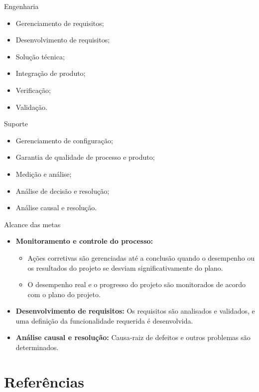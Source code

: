 \begin{frame}{Engenharia}
  \begin{itemize}[<+->]
  \item Gerenciamento de requisitos;
  \item Desenvolvimento de requisitos;
  \item Solução técnica;
  \item Integração de produto;
  \item Verificação;
  \item Validação.
  \end{itemize}
\end{frame}

\begin{frame}{Suporte}
  \begin{itemize}
  \item Gerenciamento de configuração;
  \item Garantia de qualidade de processo e produto;
  \item Medição e análise;
  \item Análise de decisão e resolução;
  \item Análise causal e resolução.
  \end{itemize}
\end{frame}

\begin{frame}{Alcance das metas}
  \begin{itemize}
  \item {\bf Monitoramento e controle do processo:} 
    \begin{itemize}
    \item Ações corretivas são gerenciadas até a conclusão quando o
      desempenho ou os resultados do projeto se desviam
      significativamente do plano.
    \item O desempenho real e o progresso do projeto são monitorados
      de acordo com o plano do projeto.
    \end{itemize}
  \item {\bf Desenvolvimento de requisitos:} Os requisitos são
    analisados e validados, e uma definição da funcionalidade
    requerida é desenvolvida.
  \item {\bf Análise causal e resolução:} Causa-raiz de defeitos e
    outros problemas são determinados.
  \end{itemize}
\end{frame}

\section{Referências}

